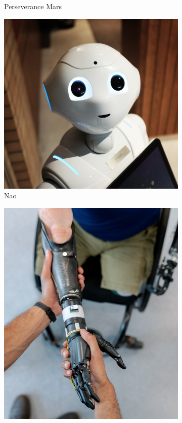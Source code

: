\begin{figure}[H]
\begin{subfigure}[b]{0.3\textwidth}
    \caption{Perseverance Mars}
    \label{fig:f2}
  \end{subfigure}
  \hfill
   \begin{subfigure}[b]{0.3\textwidth}
    \includegraphics[width=\textwidth, height=\textwidth]{chapters/images/nao.png}
    \caption{Nao}
    \label{fig:f3}
  \end{subfigure}
  \hfill
   \begin{subfigure}[b]{0.3\textwidth}
    \includegraphics[width=\textwidth, height=\textwidth]{chapters/images/brazo.png}

\end{subfigure}
\end{figure}
